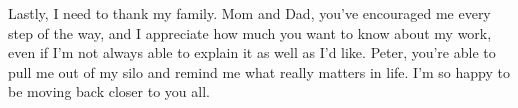 Lastly, I need to thank my family.
Mom and Dad, you've encouraged me every step of the way, and I appreciate how much you want to know about my work, even if I'm not always able to explain it as well as I'd like.
Peter, you're able to pull me out of my silo and remind me what really matters in life.
I'm so happy to be moving back closer to you all.

